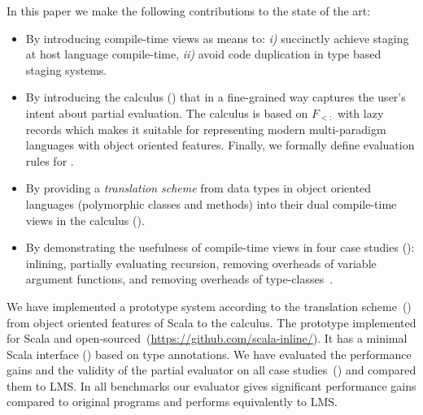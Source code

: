 In this paper we make the following contributions to the state of the art:
\begin{itemize}

 \item By introducing compile-time views as means to: \emph{i)} succinctly achieve staging
 at host language compile-time, \emph{ii)} avoid code duplication in type based
 staging systems.

 \item By introducing the \calculus calculus () that in a
  fine-grained way captures the user's intent about partial evaluation. The calculus
  is based on $F_{<:}$ with lazy records which makes it suitable for representing
  modern multi-paradigm languages with object oriented features. Finally,
  we formally define evaluation rules for \calculus.

 \item By providing a \emph{translation scheme} from data types in object oriented languages
  (polymorphic classes and methods) into their dual compile-time views in the
  \calculus calculus ().

 \item By demonstrating the usefulness of compile-time views in four case
 studies (): inlining, partially evaluating recursion,
 removing overheads of variable argument functions, and removing overheads of
 type-classes~\cite{oliveira2010type}.

\end{itemize}

We have implemented a prototype system according to the translation
 scheme~() from object oriented features of Scala to
 the \calculus calculus. The prototype implemented for Scala and
 open-sourced~(\url{https://github.com/scala-inline/}). It has a minimal Scala
 interface () based on type annotations. We have evaluated the
 performance gains and the validity of the partial evaluator on all case
 studies~() and compared them to LMS. In all benchmarks
 our evaluator gives significant performance gains compared to original programs and
 performs equivalently to LMS.




